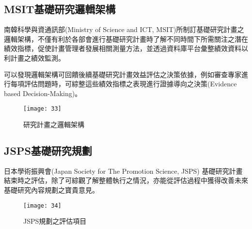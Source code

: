 \renewcommand{\baselinestretch}{20} %
\subsection{MSIT基礎研究邏輯架構}
\par
\renewcommand{\baselinestretch}{1} %
\twelve 南韓科學與資通訊部(Ministry of Science and ICT, MSIT)所制訂基礎研究計畫之邏輯架構，不僅有利於各部會進行基礎研究計畫時了解不同時間下所需關注之潛在績效指標，促使計畫管理者發展相關測量方法，並透過資料庫平台彙整績效資料以利計畫之績效監測。
\\
\par
\renewcommand{\baselinestretch}{1} %
\twelve 可以發現邏輯架構可回饋後續基礎研究計畫效益評估之決策依據，例如審查專家進行每項評估問題時，可綜整這些績效指標之表現進行證據導向之決策(Evidence based Decision-Making)。
\par
\begin{figure}[hbt!]
\begin{center}
\texttt{[image: 33]}
\caption{\large 研究計畫之邏輯架構}\label{fig.研究計畫之邏輯架構}
\end{center}
\end{figure}
\par

\renewcommand{\baselinestretch}{20} %
\subsection{JSPS基礎研究規劃}
\par
\renewcommand{\baselinestretch}{1} %
\twelve  日本學術振興會(Japan Society for The Promotion Science, JSPS) 基礎研究計畫結束時之評估，除了可綜觀了解整體執行之情況，亦能從評估過程中獲得改善未來基礎研究內容規劃之寶貴意見。
\par
\begin{figure}[hbt!]
\begin{center}
\texttt{[image: 34]}
\caption{\large JSPS規劃之評估項目}\label{fig.JSPS規劃之評估項目}
\end{center}
\end{figure}
\par

\renewcommand{\baselinestretch}{20} %
